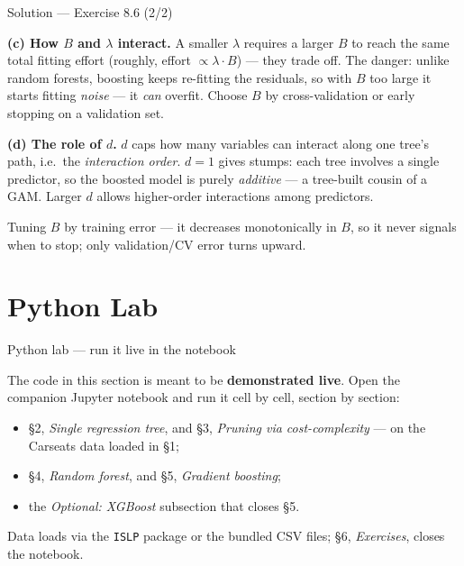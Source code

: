 \documentclass[aspectratio=169,11pt]{beamer}
\begin{document}
\begin{frame}{Solution --- Exercise 8.6 (2/2)}
\begin{solutionbox}
\textbf{(c) How $B$ and $\lambda$ interact.} A smaller $\lambda$ requires a larger $B$ to reach the same total fitting effort (roughly, effort $\propto \lambda\cdot B$) --- they trade off. The danger: unlike random forests, boosting keeps re-fitting the residuals, so with $B$ too large it starts fitting \emph{noise} --- it \emph{can} overfit. Choose $B$ by cross-validation or early stopping on a validation set.

\medskip
\textbf{(d) The role of $d$.} $d$ caps how many variables can interact along one tree's path, i.e.\ the \emph{interaction order}. $d=1$ gives stumps: each tree involves a single predictor, so the boosted model is purely \emph{additive} --- a tree-built cousin of a GAM. Larger $d$ allows higher-order interactions among predictors.
\end{solutionbox}
\begin{mistake}
Tuning $B$ by training error --- it decreases monotonically in $B$, so it never signals when to stop; only validation/CV error turns upward.
\end{mistake}
\end{frame}



\section{Python Lab}

\begin{frame}{Python lab --- run it live in the notebook}
  \begin{labnote}
    The code in this section is meant to be \textbf{demonstrated live}. Open the companion Jupyter notebook and run it cell by cell, section by section:
    \begin{itemize}
      \item \S2, \emph{Single regression tree}, and \S3, \emph{Pruning via cost-complexity} --- on the Carseats data loaded in \S1;
      \item \S4, \emph{Random forest}, and \S5, \emph{Gradient boosting};
      \item the \emph{Optional: XGBoost} subsection that closes \S5.
    \end{itemize}
    Data loads via the \texttt{ISLP} package or the bundled CSV files; \S6, \emph{Exercises}, closes the notebook.
  \end{labnote}
\end{frame}
\end{document}
